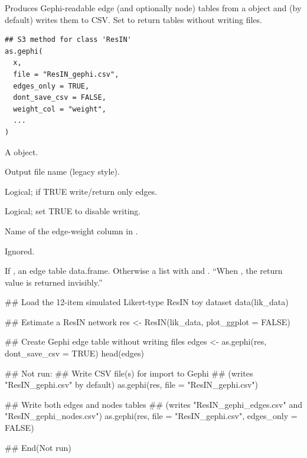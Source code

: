 \documentclass[a4paper]{book}
\begin{document}
%
\begin{Description}
Produces Gephi-readable edge (and optionally node) tables from a 
object and (by default) writes them to CSV. Set 
to return tables without writing files.
\end{Description}
%
\begin{Usage}
\begin{verbatim}
## S3 method for class 'ResIN'
as.gephi(
  x,
  file = "ResIN_gephi.csv",
  edges_only = TRUE,
  dont_save_csv = FALSE,
  weight_col = "weight",
  ...
)
\end{verbatim}
\end{Usage}
%
\begin{Arguments}
\begin{ldescription}
\item[\code{x}] A  object.

\item[\code{file}] Output file name (legacy style).

\item[\code{edges\_only}] Logical; if TRUE write/return only edges.

\item[\code{dont\_save\_csv}] Logical; set TRUE to disable writing.

\item[\code{weight\_col}] Name of the edge-weight column in .

\item[\code{...}] Ignored.
\end{ldescription}
\end{Arguments}
%
\begin{Value}
If , an edge table data.frame. Otherwise a list with  and . “When , the return value is returned invisibly.”
\end{Value}
%
\begin{Examples}
\begin{ExampleCode}
## Load the 12-item simulated Likert-type ResIN toy dataset
data(lik_data)

## Estimate a ResIN network
res <- ResIN(lik_data, plot_ggplot = FALSE)

## Create Gephi edge table without writing files
edges <- as.gephi(res, dont_save_csv = TRUE)
head(edges)

## Not run: 
## Write CSV file(s) for import to Gephi
## (writes "ResIN_gephi.csv" by default)
as.gephi(res, file = "ResIN_gephi.csv")

## Write both edges and nodes tables
## (writes "ResIN_gephi_edges.csv" and "ResIN_gephi_nodes.csv")
as.gephi(res, file = "ResIN_gephi.csv", edges_only = FALSE)

## End(Not run)


\end{ExampleCode}
\end{Examples}
\end{document}
